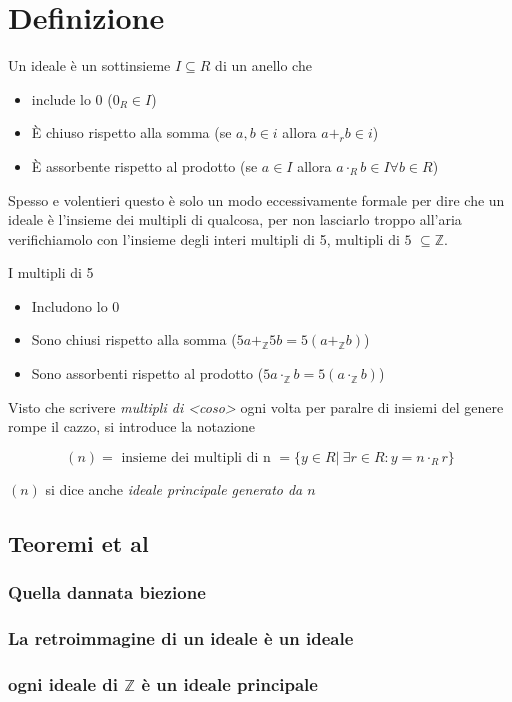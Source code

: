 \documentclass[11pt]{article}
\date{\today}
\title{}
\begin{document}
\tableofcontents

\section{Definizione}
\label{sec:orgb93c3bc}
Un ideale è un sottinsieme \(I \subseteq R\) di un anello che
\begin{itemize}
\item include lo \(0\) (\(0_R \in I\))
\item È chiuso rispetto alla somma (se \(a,b \in i\) allora \(a+_r b \in i\))
\item È assorbente rispetto al prodotto (se \(a \in I\) allora
\(a \cdot _R b \in I \forall b \in R\))
\end{itemize}

Spesso e volentieri questo è solo un modo eccessivamente formale per
dire che un ideale è l'insieme dei multipli di qualcosa, per
non lasciarlo troppo all'aria verifichiamolo con l'insieme degli
interi multipli di 5, \(\text{multipli di 5 } \subseteq \mathbb{Z}\).

I multipli di 5
\begin{itemize}
\item Includono lo 0
\item Sono chiusi rispetto alla somma (\(5a +_{\mathbb{Z}} 5b = 5(a+_{\mathbb{Z}}b)\))
\item Sono assorbenti rispetto al prodotto (\(5a \cdot_{\mathbb{Z}} b = 5(a \cdot_{\mathbb{Z}} b)\))
\end{itemize}

Visto che scrivere \emph{multipli di <coso>} ogni volta per paralre di
insiemi del genere rompe il cazzo, si introduce la notazione

\[ (n) = \text{ insieme dei multipli di n }
= \{y \in R | \ \exists  r \in R : y = n \cdot_{R} r\} \]

\((n)\) si dice anche \emph{ideale principale generato da \(n\)}

\subsection{Teoremi et al}
\label{sec:org94342a6}

\subsubsection{Quella dannata biezione}
\label{sec:org1cdec2c}

\subsubsection{La retroimmagine di un ideale è un ideale}
\label{sec:org969e930}

\subsubsection{ogni ideale di \(\mathbb{Z}\) è un ideale principale}
\label{sec:orgb830b41}
\end{document}
